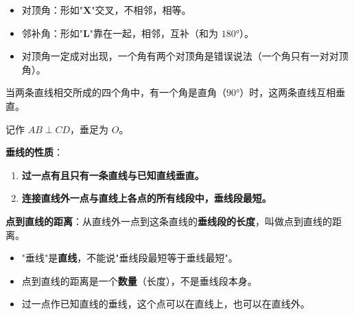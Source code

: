 \documentclass[12pt, a4paper]{ctexart}
\begin{document}
\begin{tipbox}[识别技巧]
\begin{itemize}[leftmargin=2em]
  \item 对顶角：形如"\textbf{X}"交叉，不相邻，相等。
  \item 邻补角：形如"\textbf{L}"靠在一起，相邻，互补（和为 $180°$）。
  \item 对顶角一定成对出现，一个角有两个对顶角是错误说法（一个角只有一对对顶角）。
\end{itemize}
\end{tipbox}

\begin{knowledgebox}
当两条直线相交所成的四个角中，有一个角是直角（$90°$）时，这两条直线互相垂直。

\begin{center}
\end{center}

记作 $AB \perp CD$，垂足为 $O$。

\textbf{垂线的性质}：
\begin{enumerate}[leftmargin=2em]
  \item \textbf{过一点有且只有一条直线与已知直线垂直。}
  \item \textbf{连接直线外一点与直线上各点的所有线段中，垂线段最短。}
\end{enumerate}

\textbf{点到直线的距离}：从直线外一点到这条直线的\textbf{垂线段的长度}，叫做点到直线的距离。
\end{knowledgebox}

\begin{warnbox}[易错提醒]
\begin{itemize}[leftmargin=2em]
  \item "垂线"是\textbf{直线}，不能说"垂线段最短等于垂线最短"。
  \item 点到直线的距离是一个\textbf{数量}（长度），不是垂线段本身。
  \item 过一点作已知直线的垂线，这个点可以在直线上，也可以在直线外。
\end{itemize}
\end{warnbox}
\end{document}
